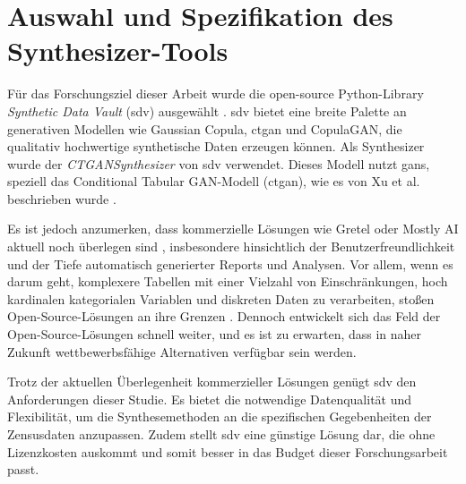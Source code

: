 \section{Auswahl und Spezifikation des Synthesizer-Tools}
\label{sec:synthesizer-tool-selection}
\begin{spacing}{1.5}

Für das Forschungsziel dieser Arbeit wurde die open-source Python-Library \textit{Synthetic Data Vault} (\acrshort{sdv}) ausgewählt \cite{synthetic_data_vault_2016}. \acrshort{sdv} bietet eine breite Palette an generativen Modellen wie Gaussian Copula, \acrshort{ctgan} und CopulaGAN, die qualitativ hochwertige synthetische Daten erzeugen können. Als Synthesizer wurde der \textit{CTGANSynthesizer} von \acrshort{sdv} verwendet. Dieses Modell nutzt \acrshort{gan}s, speziell das Conditional Tabular GAN-Modell (\acrshort{ctgan}), wie es von Xu et al. beschrieben wurde \cite{xu_modeling_2019}.

Es ist jedoch anzumerken, dass kommerzielle Lösungen wie Gretel oder Mostly AI aktuell noch überlegen sind \cite[60]{hradec_multipurpose_2022}, insbesondere hinsichtlich der Benutzerfreundlichkeit und der Tiefe automatisch generierter Reports und Analysen. Vor allem, wenn es darum geht, komplexere Tabellen mit einer Vielzahl von Einschränkungen, hoch kardinalen kategorialen Variablen und diskreten Daten zu verarbeiten, stoßen Open-Source-Lösungen an ihre Grenzen \cite[57]{hradec_multipurpose_2022}. Dennoch entwickelt sich das Feld der Open-Source-Lösungen schnell weiter, und es ist zu erwarten, dass in naher Zukunft wettbewerbsfähige Alternativen verfügbar sein werden.

Trotz der aktuellen Überlegenheit kommerzieller Lösungen genügt \acrshort{sdv} den Anforderungen dieser Studie. Es bietet die notwendige Datenqualität und Flexibilität, um die Synthesemethoden an die spezifischen Gegebenheiten der Zensusdaten anzupassen. Zudem stellt \acrshort{sdv} eine günstige Lösung dar, die ohne Lizenzkosten auskommt und somit besser in das Budget dieser Forschungsarbeit passt.

\end{spacing}
